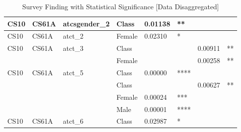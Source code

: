 \documentclass[twoside,openright,titlepage,numbers=noenddot,headinclude,%
               footinclude=true,cleardoublepage=empty,abstractoff,BCOR=5mm,%
               paper=a4,fontsize=11pt,ngerman,american]{scrreprt}
\numberwithin{theorem}{chapter}
\numberwithin{definition}{chapter}
\numberwithin{algorithm}{chapter}
\numberwithin{figure}{chapter}
\numberwithin{table}{chapter}
\numberwithin{equation}{chapter}
\begin{document}
\begin{table}[!htbp]
{\begin{tabular}{|l|l|p{2cm}|p{1.5cm}|p{1.5cm}|p{2cm}|p{1.5cm}|p{2cm}|}
CS10 & CS61A & atcsgender\_2 
& Class  & 0.01138   & ** & & \\ \hline

CS10 & CS61A & atct\_2
& Female & 0.02310   & *& & \\ \hline

CS10 & CS61A & atct\_3 
& Class   & & & 0.00911    & ** \\
& & & Female  & & & 0.00258    & ** \\ \hline

CS10 & CS61A & atct\_5
& Class & 0.00000   & **** & &  \\
& & & Class   & & & 0.00627 & ** \\
& & & Female   & 0.00024   & *** & & \\
& & & Male     & 0.00001   & **** & & \\ \hline

CS10 & CS61A & atct\_6
& Class  & 0.02987   & * & & \\ \hline

\end{tabular}}
\caption{Survey Finding with Statistical Significance [Data Disaggregated]} %
\label{surveyDisAggregated}
\end{table}
\end{document}

